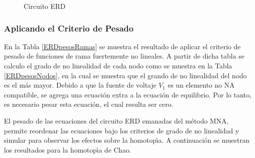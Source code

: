 \documentclass[conference,letterpaper,onecolumn]{IEEEtran}
\begin{document}
\begin{figure}[!h]
\centerline{
\epsfxsize=90mm
}
\caption{Circuito ERD}
\label{cirERD}
\end{figure}


\subsubsection{Aplicando el Criterio de Pesado}

En la Tabla \ref{ERDpesosRamas}
se muestra el resultado de aplicar el criterio de pesado de funciones
de rama fuertemente no lineales. A partir de dicha tabla se calculo el grado
de no linealidad de cada nodo como se muestra en la Tabla  \ref{ERDpesosNodos},
en la cual se muestra que el grando de no linealidad del nodo  es el m\'as mayor.
Debido a que la fuente de voltaje $V_1$ es un elemento no NA
compatible, se agrega una ecuaci\'on extra a la ecuaci\'on
de equilibrio. Por lo tanto, es necesario pesar esta ecuaci\'on, el cual resulta ser cero.




\begin{table}[!h]
\caption{Pesos de las funciones de rama del circuito ERD}
\label{ERDpesosRamas}
\end{table}

\begin{table}[!h]
\caption{Pesos de los nodos del circuito ERD}
\label{ERDpesosNodos}
\end{table}



El pesado de las ecuaciones del circuito ERD emanadas del m\'etodo MNA,
permite reordenar las ecuaciones bajo los criterios de grado de no linealidad y
simular para observar los efectos sobre la homotop\'{\i}a. A continuaci\'on
se muestran los resultados para la homotop\'{\i}a de Chao.
\end{document}
